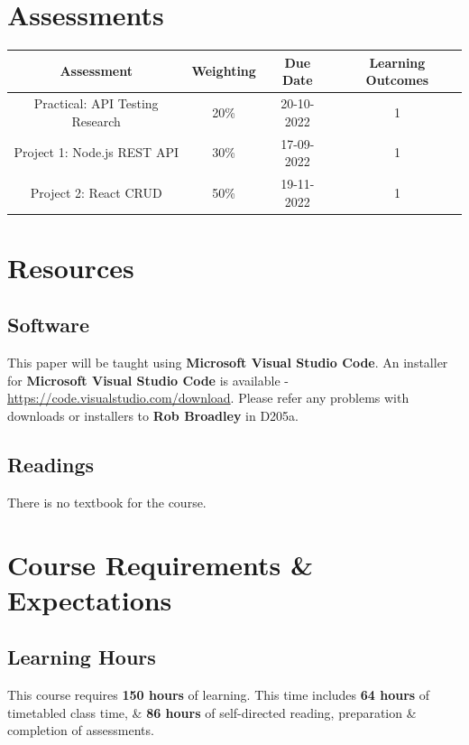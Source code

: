 \documentclass{article}
\begin{document}
\section*{Assessments}
\renewcommand{\arraystretch}{1.5}
\begin{tabular}{|c|c|c|c|}
	\hline
	\textbf{Assessment}                                & \textbf{Weighting} & \textbf{Due Date} & \textbf{Learning Outcomes} \\ \hline 
	\small Practical: API Testing Research             & \small 20\%        & \small 20-10-2022 & \small 1                   \\ \hline
	\small Project 1: Node.js REST API                      & \small 30\%        & \small 17-09-2022 & \small 1                   \\ \hline
	\small Project 2: React CRUD                       & \small 50\%        & \small 19-11-2022 & \small 1                   \\ \hline 
\end{tabular} 

\section*{Resources}

\subsection*{Software}
This paper will be taught using \textbf{Microsoft Visual Studio Code}. An installer for \textbf{Microsoft Visual Studio Code} is available - \href{https://code.visualstudio.com/download}{https://code.visualstudio.com/download}. Please refer any problems with downloads or installers to \textbf{Rob Broadley} in D205a.

\subsection*{Readings}
There is no textbook for the course.

\section*{Course Requirements \& Expectations}

\subsection*{Learning Hours}
This course requires \textbf{150 hours} of learning. This time includes \textbf{64 hours} of timetabled class time, \& \textbf{86 hours} of self-directed reading, preparation \& completion of assessments.
\end{document}
